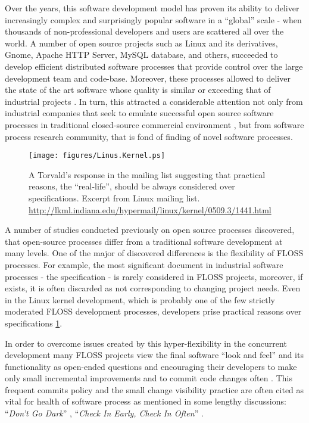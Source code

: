 Over the years, this software development model has proven its ability to deliver increasingly complex 
and surprisingly popular software in a ``global'' scale - when thousands of non-professional developers 
and users are scattered all over the world. A number of open source projects such as Linux and its 
derivatives, Gnome, Apache HTTP Server, MySQL database, and others, succeeded to develop efficient 
distributed software processes that provide control over the large development team and code-base.
Moreover, these processes allowed to deliver the state of the art software whose quality is similar 
or exceeding that of industrial projects \cite{coverity2012}. 
In turn, this attracted a considerable attention not only from industrial companies that seek to emulate 
successful open source software processes in traditional closed-source commercial environment 
\cite{oss_virtual_organizations} \cite{oss_balance} \cite{oss_hp} \cite{oss_4industry}, 
but from software process research community, that is fond of finding of novel software processes.

\begin{figure}[ht!]
   \centering
   \texttt{[image: figures/Linus.Kernel.ps]}
   \caption{A Torvald's response in the mailing list suggesting that practical reasons, the ``real-life'', 
   should be always considered over specifications.
   Excerpt from Linux mailing list. \url{http://lkml.indiana.edu/hypermail/linux/kernel/0509.3/1441.html}}
   \label{fig:kernel}
\end{figure}

A number of studies conducted previously on open source processes discovered, that open-source processes 
differ from a traditional software development at many levels. One of the major of discovered differences 
is the flexibility of FLOSS processes. For example, the most significant document in industrial software 
processes - the specification - is rarely considered in FLOSS projects, moreover, if exists, it is often 
discarded as not corresponding to changing project needs. Even in the Linux kernel development, which is 
probably one of the few strictly moderated FLOSS development processes, developers prise practical reasons 
over specifications \ref{fig:kernel}.

In order to overcome issues created by this hyper-flexibility in the concurrent development many FLOSS 
projects view the final software ``look and feel'' and its functionality as open-ended questions and 
encouraging their developers to make only small incremental improvements and to commit code changes often 
\cite{so-checkin} \cite{git-best-practices1}. This frequent commits policy and the small change visibility 
practice are often cited as vital for health of software process as mentioned in some lengthy discussions: 
``\textit{Don't Go Dark}'' \cite{checkin-dgd-2008}, ``\textit{Check In Early, Check In Often}'' \cite{checkin-ch-2012}. 

